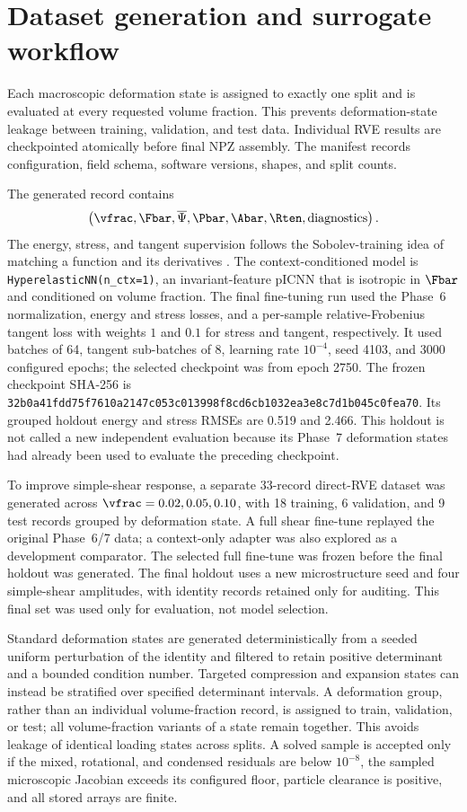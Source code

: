 \section{Dataset generation and surrogate workflow}

Each macroscopic deformation state is assigned to exactly one split and is
evaluated at every requested volume fraction. This prevents deformation-state
leakage between training, validation, and test data. Individual RVE results
are checkpointed atomically before final NPZ assembly. The manifest records
configuration, field schema, software versions, shapes, and split counts.

The generated record contains
\begin{equation}
  \left(\vfrac,\Fbar,\overline\Psi,\Pbar,\Abar,\Rten,
  \text{diagnostics}\right).
\end{equation}
The energy, stress, and tangent supervision follows the Sobolev-training idea
of matching a function and its derivatives \cite{czarnecki2017}. The
context-conditioned model is
\texttt{HyperelasticNN(n\_ctx=1)}, an invariant-feature pICNN that is
isotropic in \(\Fbar\) and conditioned on volume fraction. The final
fine-tuning run used the Phase~6 normalization, energy and stress losses, and
a per-sample relative-Frobenius tangent loss with weights \(1\) and \(0.1\)
for stress and tangent, respectively. It used batches of 64, tangent
sub-batches of 8, learning rate \(10^{-4}\), seed 4103, and 3000 configured
epochs; the selected checkpoint was from epoch 2750. The frozen checkpoint
SHA-256 is
\texttt{32b0a41fdd75f7610a2147c053c013998f8cd6cb1032ea3e8c7d1b045c0fea70}.
Its grouped holdout energy and stress RMSEs are 0.519 and 2.466. This holdout
is not called a new independent evaluation because its Phase~7 deformation
states had already been used to evaluate the preceding checkpoint.

To improve simple-shear response, a separate 33-record direct-RVE dataset was
generated across \(\vfrac=0.02,0.05,0.10\), with 18 training, 6 validation,
and 9 test records grouped by deformation state. A full shear fine-tune
replayed the original Phase~6/7 data; a context-only adapter was also explored
as a development comparator. The selected full fine-tune was frozen before
the final holdout was generated. The final holdout uses a new microstructure
seed and four simple-shear amplitudes, with identity records retained only for
auditing. This final set was used only for evaluation, not model selection.

Standard deformation states are generated deterministically from a seeded
uniform perturbation of the identity and filtered to retain positive
determinant and a bounded condition number. Targeted compression and
expansion states can instead be stratified over specified determinant
intervals. A deformation group, rather than an individual volume-fraction
record, is assigned to train, validation, or test; all volume-fraction
variants of a state remain together. This avoids leakage of identical
loading states across splits. A solved sample is accepted only if the mixed,
rotational, and condensed residuals are below \(10^{-8}\), the sampled
microscopic Jacobian exceeds its configured floor, particle clearance is
positive, and all stored arrays are finite.

